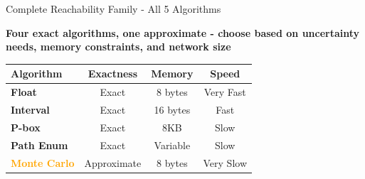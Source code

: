 \documentclass[aspectratio=169]{beamer}
\begin{document}
\begin{frame}{\textcolor{juliapurple}{Complete Reachability Family - All 5 Algorithms}}

\begin{center}
\textbf{Four exact algorithms, one approximate - choose based on uncertainty needs, memory constraints, and network size}
\end{center}

\vspace{0.5em}


\begin{center}
\begin{tabular}{|l|c|c|c|}
\hline
\textbf{Algorithm} & \textbf{Exactness} & \textbf{Memory} & \textbf{Speed} \\
\hline
\textcolor{juliagreen}{\textbf{Float}} & Exact & 8 bytes & Very Fast \\
\hline
\textcolor{juliablue}{\textbf{Interval}} & Exact & 16 bytes & Fast \\
\hline
\textcolor{juliared}{\textbf{P-box}} & Exact & 8KB & Slow \\
\hline
\textcolor{juliapurple}{\textbf{Path Enum}} & Exact & Variable & Slow \\
\hline
\textcolor{orange}{\textbf{Monte Carlo}} & Approximate & 8 bytes & Very Slow \\
\hline
\end{tabular}
\end{center}

\end{frame}
\end{document}
